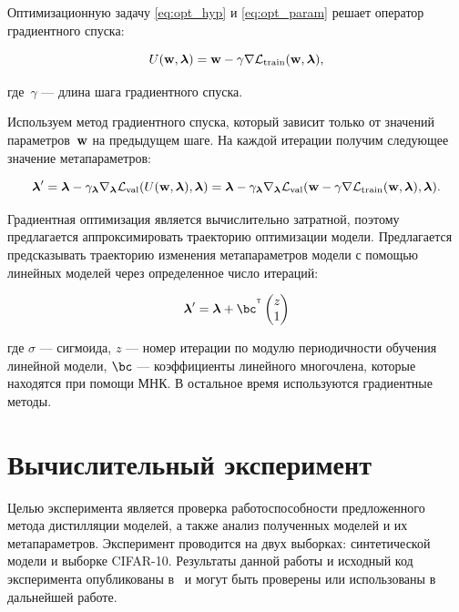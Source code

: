 \documentclass[12pt, twoside]{article}
\begin{document}
Оптимизационную задачу \eqref{eq:opt_hyp} и \eqref{eq:opt_param} решает оператор градиентного спуска:

\begin{equation} \label{eq:operator}
    U(\bw, \boldsymbol{\lambda}) = \bw - \gamma\nabla\cL_\text{train}(\bw, \boldsymbol{\lambda}),
\end{equation}

\noindent
где~$\gamma$ — длина шага градиентного спуска.

\noindent
Используем метод градиентного спуска, который зависит только от значений параметров~$\mathbf{w}$ на предыдущем шаге. На каждой итерации получим следующее значение метапараметров:

\begin{equation} \label{eq:hyp_alg}
    \boldsymbol{\lambda}^\prime = \boldsymbol{\lambda} - \gamma_{\boldsymbol{\lambda}}\nabla_{\boldsymbol{\lambda}}\cL_\text{val}(U(\bw, \boldsymbol{\lambda}), \boldsymbol{\lambda}) = \boldsymbol{\lambda} - \gamma_{\boldsymbol{\lambda}}\nabla_{\boldsymbol{\lambda}}\cL_\text{val}(\bw - \gamma\nabla\cL_\text{train}(\bw, \boldsymbol{\lambda}), \boldsymbol{\lambda}).
\end{equation}

Градиентная оптимизация является вычислительно затратной, поэтому предлагается аппроксимировать траекторию оптимизации модели. Предлагается предсказывать траекторию изменения метапараметров модели с помощью линейных моделей через определенное число итераций:

\begin{equation}
    \boldsymbol{\lambda}^\prime =  \boldsymbol{\lambda} + \bc^{\T}\begin{pmatrix}z\\1\end{pmatrix}
\end{equation}

\noindent
где $\sigma$ --- сигмоида, $z$ --- номер итерации по модулю периодичности обучения линейной модели, $\bc$ --- коэффициенты линейного многочлена, которые находятся при помощи МНК. В остальное время используются градиентные методы.

\section{Вычислительный эксперимент}

Целью эксперимента является проверка работоспособности предложенного метода дистилляции моделей, а также анализ полученных моделей и их метапараметров. Эксперимент проводится на двух выборках: синтетической модели и выборке CIFAR-10. Результаты данной работы и исходный код эксперимента опубликованы в~\cite{distknow} и могут быть проверены или использованы в дальнейшей работе.
\end{document}
